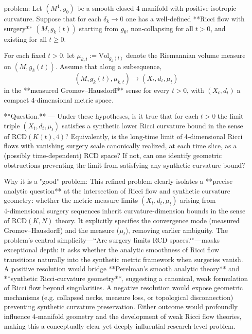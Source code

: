problem:  
Let \( (M^4, g_0) \) be a smooth closed 4‑manifold with positive isotropic curvature.  
Suppose that for each \( \delta_k \to 0 \) one has a well‑defined **Ricci flow with surgery** \( (M, g_k(t)) \) starting from \( g_0 \), non‑collapsing for all \(t>0\), and existing for all \(t\ge 0\).  

For each fixed \(t>0\), let \( \mu_{k,t} := \mathrm{Vol}_{g_k(t)} \) denote the Riemannian volume measure on \( (M,g_k(t)) \).  
Assume that along a subsequence,  
\[
(M, g_k(t), \mu_{k,t}) \to (X_t, d_t, \mu_t)
\]
in the **measured Gromov–Hausdorff** sense for every \(t>0\), with \( (X_t, d_t) \) a compact 4‑dimensional metric space.  

**Question.** — Under these hypotheses, is it true that for each \(t>0\) the limit triple \( (X_t, d_t, \mu_t) \) satisfies a synthetic lower Ricci curvature bound in the sense of \(\mathrm{RCD}(K(t),4)\)?  
Equivalently, is the long‑time limit of 4‑dimensional Ricci flows with vanishing surgery scale canonically realized, at each time slice, as a (possibly time‑dependent) RCD space?  
If not, can one identify geometric obstructions preventing the limit from satisfying any synthetic curvature bound?

Why it is a "good" problem:  
This refined problem clearly isolates a **precise analytic question** at the intersection of Ricci flow and synthetic curvature geometry: whether the metric‑measure limits \((X_t, d_t, \mu_t)\) arising from 4‑dimensional surgery sequences inherit curvature‑dimension bounds in the sense of \(\mathrm{RCD}(K,N)\) theory.  
It explicitly specifies the convergence mode (measured Gromov–Hausdorff) and the measure (\(\mu_t\)), removing earlier ambiguity.  
The problem’s central simplicity—“Are surgery limits RCD spaces?”—masks exceptional depth: it asks whether the analytic smoothness of Ricci flow transitions naturally into the synthetic metric framework when surgeries vanish.  
A positive resolution would bridge **Perelman’s smooth analytic theory** and **synthetic Ricci‑curvature geometry**, suggesting a canonical, weak formulation of Ricci flow beyond singularities.  
A negative resolution would expose geometric mechanisms (e.g. collapsed necks, measure loss, or topological disconnection) preventing synthetic curvature preservation.  
Either outcome would profoundly influence 4‑manifold geometry and the development of weak Ricci flow theories, making this a conceptually clear yet deeply influential research‑level problem.